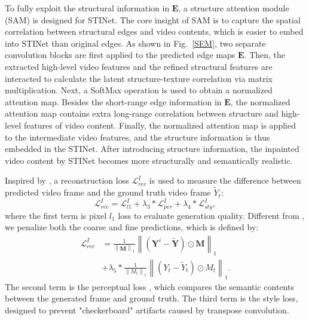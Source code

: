 To fully exploit the structural information in $\boldsymbol{E}$, a structure attention module (SAM) is designed for STINet.
The core insight of SAM is to capture the spatial correlation between structural edges and video contents, which is easier to embed into STINet than original edges.
As shown in Fig.~\ref{SEM}, two separate convolution blocks are first applied to the predicted edge maps $\boldsymbol{E}$.
Then, the extracted high-level video features and the refined structural features are interacted to calculate the latent structure-texture correlation via matrix multiplication. 
%
Next, a SoftMax operation is used to obtain a normalized attention map.
%
Besides the short-range edge information in $\boldsymbol{E}$, the normalized attention map contains extra long-range correlation between structure and high-level features of video content.
Finally, the normalized attention map is applied to the intermediate video features, and the structure information is thus embedded in the STINet.
After introducing structure information, the inpainted video content by STINet becomes more structurally and semantically realistic.



Inspired by \cite{nazeri2019edgeconnect}, a reconstruction loss $\mathcal{L}^{I}_{rec}$ is used to measure the difference between predicted video frame and the ground truth video frame $\widetilde{Y}_t$:
\begin{equation}
	\mathcal{L}^{I}_{rec}=\mathcal{L}^{I}_{l1}+\lambda_3 *\mathcal{L}^{I}_{per}+\lambda_4 *\mathcal{L}^{I}_{sty},
\end{equation}
%
where the first term is pixel $l_1$ loss to evaluate generation quality. Different from \cite{nazeri2019edgeconnect}, we penalize both the coarse and fine predictions, which is defined by:
\begin{equation}
	\begin{aligned}
		\mathcal{L}^{I}_{rec}&=\frac{1}{\left\|\boldsymbol{M} \right\|_1}\left\|(\boldsymbol{Y}^i-\widetilde{\boldsymbol{Y}})\odot \boldsymbol{M}\right\|_1\\ &+\lambda_5*\frac{1}{\left\|M_t \right\|_1}\left\|(Y_t-\widetilde{Y}_t)\odot M_t\right\|_1.
	\end{aligned}
\end{equation}
%
The second term is the perceptual loss \cite{gatys2015neural}, which compares the semantic contents between the generated frame and ground truth. The third term is the style loss, designed to prevent "checkerboard" artifacts \cite{Sajjadi_2017_ICCV} caused by transpose convolution.


